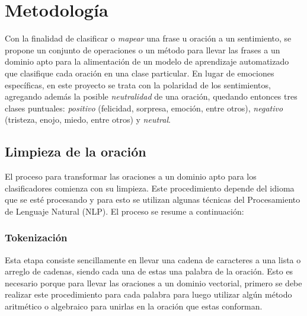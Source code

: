 \documentclass[conference]{IEEEtran}
\begin{document}



\section{Metodología} \label{sec:metodologia}

    Con la finalidad de clasificar o \textit{mapear} una frase u oración a un sentimiento, se propone un conjunto de operaciones o un método para llevar las frases a un dominio apto para la alimentación de un modelo de aprendizaje automatizado que clasifique cada oración en una clase particular. En lugar de emociones específicas, en este proyecto se trata con la polaridad de los sentimientos, agregando además la posible \textit{neutralidad} de una oración, quedando entonces tres clases puntuales: \textit{positivo} (felicidad, sorpresa, emoción, entre otros), \textit{negativo} (tristeza, enojo, miedo, entre otros) y \textit{neutral}.

    
    \subsection{Limpieza de la oración}
    
    	El proceso para transformar las oraciones a un dominio apto para los clasificadores comienza con su limpieza. Este procedimiento depende del idioma que se esté procesando y para esto se utilizan algunas técnicas del Procesamiento de Lenguaje Natural (NLP). El proceso se resume a continuación:
    	\newline
    	
    	\subsubsection{Tokenización}
    	
    		Esta etapa consiste sencillamente en llevar una cadena de caracteres a una lista o arreglo de cadenas, siendo cada una de estas una palabra de la oración. Esto es necesario porque para llevar las oraciones a un dominio vectorial, primero se debe realizar este procedimiento para cada palabra para luego utilizar algún método aritmético o algebraico para unirlas en la oración que estas conforman.
    		\newline
    	
\end{document}
